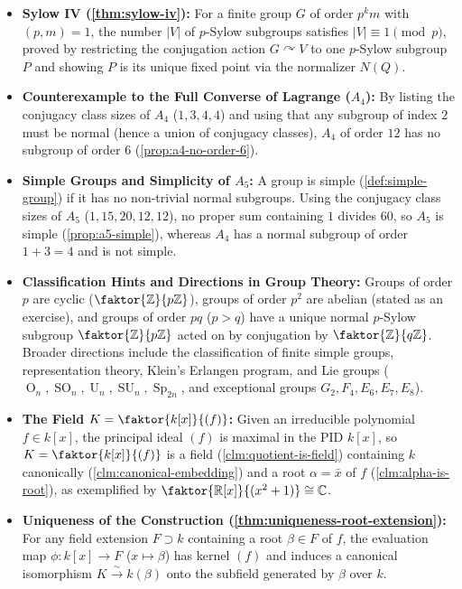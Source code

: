 \begin{overview}
\begin{itemize}
    \item \textbf{Sylow IV (\cref{thm:sylow-iv}):} For a finite group $G$ of order $p^k m$ with $(p, m) = 1$, the number $|V|$ of $p$-Sylow subgroups satisfies $|V| \equiv 1 \pmod p$, proved by restricting the conjugation action $G \curvearrowright V$ to one $p$-Sylow subgroup $P$ and showing $P$ is its unique fixed point via the normalizer $N(Q)$.
    \item \textbf{Counterexample to the Full Converse of Lagrange ($A_4$):} By listing the conjugacy class sizes of $A_4$ ($1, 3, 4, 4$) and using that any subgroup of index $2$ must be normal (hence a union of conjugacy classes), $A_4$ of order $12$ has no subgroup of order $6$ (\cref{prop:a4-no-order-6}).
    \item \textbf{Simple Groups and Simplicity of $A_5$:} A group is simple (\cref{def:simple-group}) if it has no non-trivial normal subgroups. Using the conjugacy class sizes of $A_5$ ($1, 15, 20, 12, 12$), no proper sum containing $1$ divides $60$, so $A_5$ is simple (\cref{prop:a5-simple}), whereas $A_4$ has a normal subgroup of order $1 + 3 = 4$ and is not simple.
    \item \textbf{Classification Hints and Directions in Group Theory:} Groups of order $p$ are cyclic ($\faktor{\mathbb{Z}}{p\mathbb{Z}}$), groups of order $p^2$ are abelian (stated as an exercise), and groups of order $pq$ ($p > q$) have a unique normal $p$-Sylow subgroup $\faktor{\mathbb{Z}}{p\mathbb{Z}}$ acted on by conjugation by $\faktor{\mathbb{Z}}{q\mathbb{Z}}$. Broader directions include the classification of finite simple groups, representation theory, Klein's Erlangen program, and Lie groups ($\operatorname{O}_n, \operatorname{SO}_n, \operatorname{U}_n, \operatorname{SU}_n, \operatorname{Sp}_{2n}$, and exceptional groups $G_2, F_4, E_6, E_7, E_8$).
    \item \textbf{The Field $K = \faktor{k[x]}{(f)}$:} Given an irreducible polynomial $f \in k[x]$, the principal ideal $(f)$ is maximal in the $\mathrm{PID}$ $k[x]$, so $K = \faktor{k[x]}{(f)}$ is a field (\cref{clm:quotient-is-field}) containing $k$ canonically (\cref{clm:canonical-embedding}) and a root $\alpha = \bar{x}$ of $f$ (\cref{clm:alpha-is-root}), as exemplified by $\faktor{\mathbb{R}[x]}{(x^2+1)} \cong \mathbb{C}$.
    \item \textbf{Uniqueness of the Construction (\cref{thm:uniqueness-root-extension}):} For any field extension $F \supset k$ containing a root $\beta \in F$ of $f$, the evaluation map $\phi \colon k[x] \to F$ ($x \mapsto \beta$) has kernel $(f)$ and induces a canonical isomorphism $K \xrightarrow{\sim} k(\beta)$ onto the subfield generated by $\beta$ over $k$.
\end{itemize}
\end{overview}